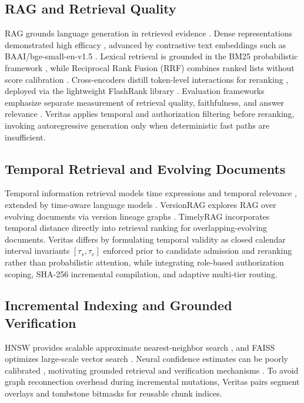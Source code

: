\documentclass[journal]{IEEEtran}
\newcommand{\sys}{Veritas}
\begin{document}
\subsection{RAG and Retrieval Quality}
RAG grounds language generation in retrieved evidence \cite{lewis2020rag}. Dense representations demonstrated high efficacy \cite{karpukhin2020dpr}, advanced by contrastive text embeddings such as BAAI/bge-small-en-v1.5 \cite{xiao2024bge}. Lexical retrieval is grounded in the BM25 probabilistic framework \cite{robertson2009bm25}, while Reciprocal Rank Fusion (RRF) combines ranked lists without score calibration \cite{cormack2009rrf}. Cross-encoders distill token-level interactions for reranking \cite{jiao2020tinybert}, deployed via the lightweight FlashRank library \cite{flashrank}. Evaluation frameworks emphasize separate measurement of retrieval quality, faithfulness, and answer relevance \cite{es2024ragas,saadfalcon2024ares,niu2024ragtruth}. \sys{} applies temporal and authorization filtering before reranking, invoking autoregressive generation only when deterministic fast paths are insufficient.

\subsection{Temporal Retrieval and Evolving Documents}
Temporal information retrieval models time expressions and temporal relevance \cite{campos2014temporal}, extended by time-aware language models \cite{dhingra2022time}. VersionRAG explores RAG over evolving documents via version lineage graphs \cite{huwiler2025versionrag}. TimelyRAG \cite{timelyrag2026} incorporates temporal distance directly into retrieval ranking for overlapping-evolving documents. \sys{} differs by formulating temporal validity as closed calendar interval invariants $[\tau_s, \tau_e]$ enforced prior to candidate admission and reranking rather than probabilistic attention, while integrating role-based authorization scoping, SHA-256 incremental compilation, and adaptive multi-tier routing.

\subsection{Incremental Indexing and Grounded Verification}
HNSW provides scalable approximate nearest-neighbor search \cite{malkov2020hnsw}, and FAISS optimizes large-scale vector search \cite{johnson2021faiss}. Neural confidence estimates can be poorly calibrated \cite{guo2017calibration}, motivating grounded retrieval and verification mechanisms \cite{asai2024selfrag}. To avoid graph reconnection overhead during incremental mutations, \sys{} pairs segment overlays and tombstone bitmasks for reusable chunk indices.
\end{document}
